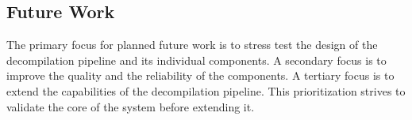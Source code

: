 
\subsection{Future Work}
\label{sec:con_future_work}

The primary focus for planned future work is to stress test the design of the decompilation pipeline and its individual components. A secondary focus is to improve the quality and the reliability of the components. A tertiary focus is to extend the capabilities of the decompilation pipeline. This prioritization strives to validate the core of the system before extending it.





